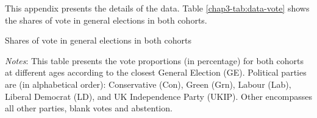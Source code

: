 This appendix presents the details of the data. Table \ref{chap3-tab:data-vote} shows the shares of vote in general elections in both cohorts.

\begin{table}[!htb]
    \centering
    \caption{Shares of vote in general elections in both cohorts}
    \label{chap3-tab:data-vote}
    \begin{threeparttable}
        
        \begin{tablenotes}[flushleft]
            \footnotesize{\item \textit{Notes}: This table presents the vote proportions (in percentage) for both cohorts at different ages according to the closest General Election (GE). Political parties are (in alphabetical order): Conservative (Con), Green (Grn), Labour (Lab), Liberal Democrat (LD), and UK Independence Party (UKIP). Other encompasses all other parties, blank votes and abstention.}
        \end{tablenotes}
    \end{threeparttable}
\end{table}